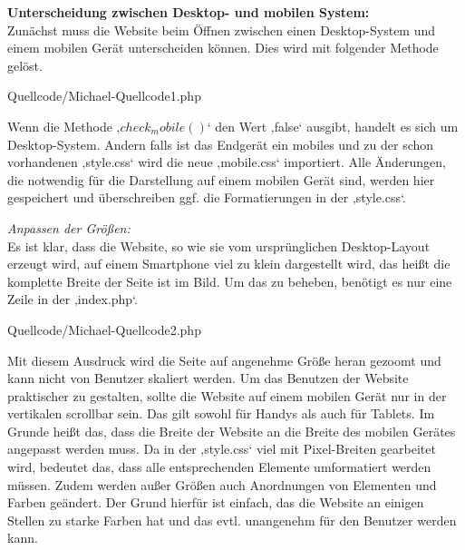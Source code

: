 \textbf{Unterscheidung zwischen Desktop- und mobilen System:}
\\
Zunächst muss die Website beim Öffnen zwischen einen Desktop-System und einem mobilen Gerät unterscheiden können. Dies wird mit folgender Methode gelöst.

\begin{center}
	\begin{lstinputlisting}[language=PHP, caption={Unterscheidung Desktop und mobiles Gerät}]
		{Quellcode/Michael-Quellcode1.php}
	\end{lstinputlisting}
\end{center}

Wenn die Methode $‚check_mobile()‘$ den Wert ‚false‘ ausgibt, handelt es sich um Desktop-System. Andern falls ist das Endgerät ein mobiles und zu der schon vorhandenen ‚style.css‘ wird die neue ‚mobile.css‘ importiert. Alle Änderungen, die notwendig für die Darstellung auf einem mobilen Gerät sind, werden hier gespeichert und überschreiben ggf. die Formatierungen in der ‚style.css‘.

\textit{Anpassen der Größen:}
\\
Es ist klar, dass die Website, so wie sie  vom ursprünglichen Desktop-Layout erzeugt wird, auf einem Smartphone viel zu klein dargestellt wird, das heißt die komplette Breite der Seite ist im Bild. Um das zu beheben, benötigt es nur eine Zeile in der ‚index.php‘.

\begin{center}
	\begin{lstinputlisting}[language=PHP, caption={Auszug aus der Index-Datei}]
		{Quellcode/Michael-Quellcode2.php}
	\end{lstinputlisting}
\end{center}

Mit diesem Ausdruck wird die Seite auf angenehme Größe heran gezoomt und kann nicht von Benutzer skaliert werden. 
Um das Benutzen der Website praktischer zu gestalten, sollte die Website auf einem mobilen Gerät nur in der vertikalen scrollbar sein. Das gilt sowohl für Handys als auch für Tablets. Im Grunde heißt das, dass die Breite der Website an die Breite des mobilen Gerätes angepasst werden muss. Da in der ‚style.css‘ viel mit Pixel-Breiten gearbeitet wird, bedeutet das, dass alle entsprechenden Elemente umformatiert werden müssen.
Zudem werden außer Größen auch Anordnungen von Elementen und Farben geändert. Der Grund hierfür ist einfach, das die Website an einigen Stellen zu starke Farben hat und das evtl. unangenehm für den Benutzer werden kann. 



